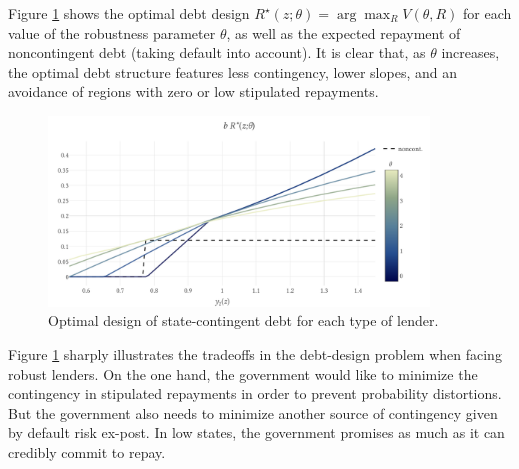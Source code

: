 Figure \ref{Figure_arrow} shows the optimal debt design $R^\star(z;\theta) = \arg\max_R V(\theta,R)$ for each value of the robustness parameter $\theta$, as well as the expected repayment of noncontingent debt (taking default into account). It is clear that, as $\theta$ increases, the optimal debt structure features less contingency, lower slopes, and an avoidance of regions with zero or low stipulated repayments.
\begin{figure}[!hbtp]\centering
    \includegraphics[width=0.9\textwidth]{arrow_paper.pdf}
\caption{Optimal design of state-contingent debt for each type of lender.
\label{Figure_arrow}}
\end{figure}
Figure \ref{Figure_arrow} sharply illustrates the tradeoffs in the debt-design problem when facing robust lenders. On the one hand, the government would like to minimize the contingency in stipulated repayments in order to prevent probability distortions. But the government also needs to minimize another source of contingency given by default risk ex-post. In low states, the government promises as much as it can credibly commit to repay.

